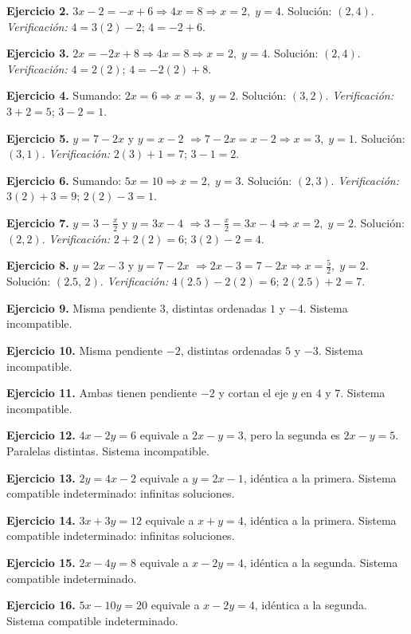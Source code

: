 \documentclass[12pt]{article}
\begin{document}
\textbf{Ejercicio 2.} \(3x-2=-x+6 \Rightarrow 4x=8 \Rightarrow x=2,\; y=4\). Solución: \((2,4)\). \textit{Verificación:} \(4=3(2)-2\); \(4=-2+6\). \checkmark

\textbf{Ejercicio 3.} \(2x=-2x+8 \Rightarrow 4x=8 \Rightarrow x=2,\; y=4\). Solución: \((2,4)\). \textit{Verificación:} \(4=2(2)\); \(4=-2(2)+8\). \checkmark

\textbf{Ejercicio 4.} Sumando: \(2x=6 \Rightarrow x=3,\; y=2\). Solución: \((3,2)\). \textit{Verificación:} \(3+2=5\); \(3-2=1\). \checkmark

\textbf{Ejercicio 5.} \(y=7-2x\) y \(y=x-2\) \(\Rightarrow 7-2x=x-2 \Rightarrow x=3,\; y=1\). Solución: \((3,1)\). \textit{Verificación:} \(2(3)+1=7\); \(3-1=2\). \checkmark

\textbf{Ejercicio 6.} Sumando: \(5x=10 \Rightarrow x=2,\; y=3\). Solución: \((2,3)\). \textit{Verificación:} \(3(2)+3=9\); \(2(2)-3=1\). \checkmark

\textbf{Ejercicio 7.} \(y=3-\tfrac{x}{2}\) y \(y=3x-4\) \(\Rightarrow 3-\tfrac{x}{2}=3x-4 \Rightarrow x=2,\; y=2\). Solución: \((2,2)\). \textit{Verificación:} \(2+2(2)=6\); \(3(2)-2=4\). \checkmark

\textbf{Ejercicio 8.} \(y=2x-3\) y \(y=7-2x\) \(\Rightarrow 2x-3=7-2x \Rightarrow x=\tfrac{5}{2},\; y=2\). Solución: \((2.5,\,2)\). \textit{Verificación:} \(4(2.5)-2(2)=6\); \(2(2.5)+2=7\). \checkmark

\textbf{Ejercicio 9.} Misma pendiente \(3\), distintas ordenadas \(1\) y \(-4\). Sistema incompatible.

\textbf{Ejercicio 10.} Misma pendiente \(-2\), distintas ordenadas \(5\) y \(-3\). Sistema incompatible.

\textbf{Ejercicio 11.} Ambas tienen pendiente \(-2\) y cortan el eje \(y\) en \(4\) y \(7\). Sistema incompatible.

\textbf{Ejercicio 12.} \(4x-2y=6\) equivale a \(2x-y=3\), pero la segunda es \(2x-y=5\). Paralelas distintas. Sistema incompatible.

\textbf{Ejercicio 13.} \(2y=4x-2\) equivale a \(y=2x-1\), idéntica a la primera. Sistema compatible indeterminado: infinitas soluciones.

\textbf{Ejercicio 14.} \(3x+3y=12\) equivale a \(x+y=4\), idéntica a la primera. Sistema compatible indeterminado: infinitas soluciones.

\textbf{Ejercicio 15.} \(2x-4y=8\) equivale a \(x-2y=4\), idéntica a la segunda. Sistema compatible indeterminado.

\textbf{Ejercicio 16.} \(5x-10y=20\) equivale a \(x-2y=4\), idéntica a la segunda. Sistema compatible indeterminado.
\end{document}
